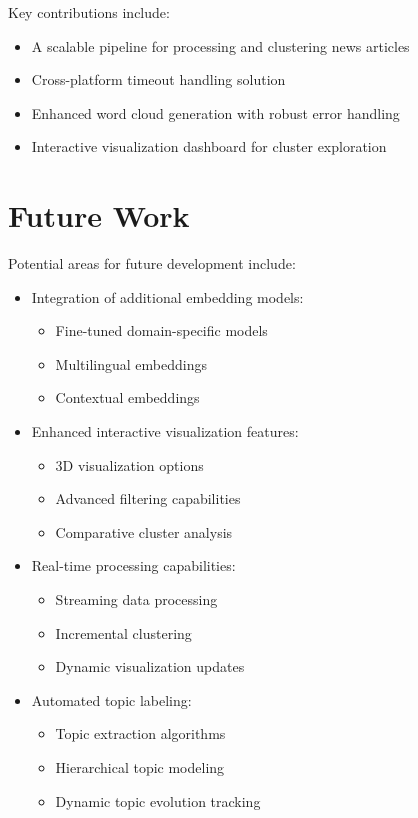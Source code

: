 \documentclass[conference]{IEEEtran}
\begin{document}
Key contributions include:
\begin{itemize}
    \item A scalable pipeline for processing and clustering news articles
    \item Cross-platform timeout handling solution
    \item Enhanced word cloud generation with robust error handling
    \item Interactive visualization dashboard for cluster exploration
\end{itemize}

\section{Future Work}
Potential areas for future development include:
\begin{itemize}
    \item Integration of additional embedding models:
        \begin{itemize}
            \item Fine-tuned domain-specific models
            \item Multilingual embeddings
            \item Contextual embeddings
        \end{itemize}
    \item Enhanced interactive visualization features:
        \begin{itemize}
            \item 3D visualization options
            \item Advanced filtering capabilities
            \item Comparative cluster analysis
        \end{itemize}
    \item Real-time processing capabilities:
        \begin{itemize}
            \item Streaming data processing
            \item Incremental clustering
            \item Dynamic visualization updates
        \end{itemize}
    \item Automated topic labeling:
        \begin{itemize}
            \item Topic extraction algorithms
            \item Hierarchical topic modeling
            \item Dynamic topic evolution tracking
        \end{itemize}
\end{itemize}



\end{document}
